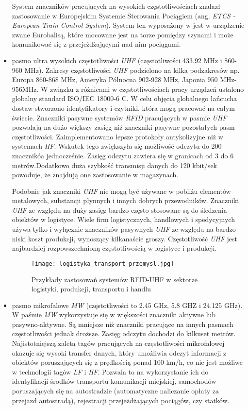 \begin{itemize}
	 System znaczników pracujących na wysokich częstotliwościach znalazł zastosowanie w Europejskim Systemie Sterowania Pociągiem (ang. \emph{ETCS - European Train Control System}). System ten wyposażony w jest w urządzenie zwane Eurobalisą, które mocowane jest na torze pomiędzy szynami i może komunikować się z przejeżdżającymi nad nim pociągami.


	\item pasmo ultra wysokich częstotliwości \emph{UHF} (częstotliwości 433.92 MHz i 860-960 MHz).
Zakresy częstotliwości \emph{UHF} podzielono na kilka podzakresów np. Europa 860-868 MHz, Ameryka Północna 902-928 MHz, Japonia  950 MHz-956MHz. W związku z różnicami w częstotliwościach pracy urządzeń ustalono globalny standard ISO/IEC 18000-6 C. W celu objęcia globalnego łańcucha dostaw stworzono identyfikatory i czytniki, która mogą pracować na całym świecie. Znaczniki pasywne systemów \emph{RFID} pracujących w pasmie \emph{UHF} pozwalają na dużo większy zasięg niż znaczniki pasywne pozostałych pasm częstotliwości. Zaimplementowano lepsze protokoły antykolizyjne niż w systemach \emph{HF}. Wskutek tego zwiększyła się możliwość odczytu do 200 znacznikóa jednocześnie. Zasięg odczytu zawiera się w granicach od 3 do 6 metrów.Dodatkowo duża szybkość transmisji danych do 120 kbit/sek powoduje, że znajdują one zastosowanie w magazynach.

Podobnie jak znaczniki \emph{UHF} nie mogą być używane w pobliżu elementów metalowych, substancji płynnych i innych dobrych przewodników. 
Znaczniki \emph{UHF} ze względu na duży zasięg bardzo często stosowane są do śledzenia obiektów w logistyce. Wiele firm logistycznych, handlowych i spedycyjnych używa tylko i wyłącznie znaczników pasywnych \emph{UHF} ze względu na bardzo niski koszt produkcji, wynoszący kilkanaście groszy. 
Częstotliwość \emph{UHF} jest najbardziej rozpowszechnioną częstotliwością w logistyce i produkcji.

	\begin{figure}[h!]
	\centering
	    \texttt{[image: logistyka\_transport\_przemysl.jpg]}
	    \caption{Przykłady zastosowań systemów RFID-UHF w sektorze logistyki, produkcji, transportu i handlu}
	\end{figure}

	\item pasmo mikrofalowe \emph{MW} (częstotliwości to 2.45 GHz, 5.8 GHZ i 24.125 GHz).
W paśmie \emph{MW} wykorzystuje się w większości znaczniki aktywne lub pasywno-aktywne. Są  mniejsze niż znaczniki pracujące na innych pasmach częstotliwości jednak droższe. Zasięg odczytu dochodzi do kilkuset metrów. Najistotniejszą zaletą tagów pracujących na częstotliwości mikrofalowej okazuje się wysoki transfer danych, który  umożliwia odczyt informacji z obiektów poruszających się z prędkością ponad 100 km/h, co nie jest możliwe w technologii tagów \emph{LF} i \emph{HF}. Pozwala to na wykorzystanie ich do identyfikacji środków transportu komunikacji miejskiej, samochodów poruszających się  na autostradzie (automatyczne naliczanie opłaty za przejazd autostradą), rejestracji przejeżdżających pociągów, czy statków.


\end{itemize}
